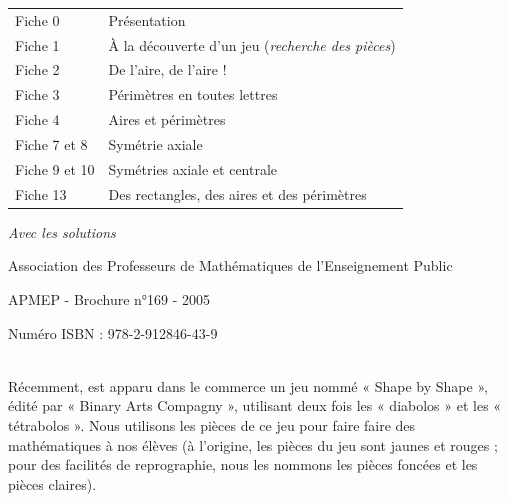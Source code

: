 \documentclass[a4paper,10pt]{article}
\begin{document}
{
	\renewcommand{\arraystretch}{1.1}
	\Large
	\hspace{-1cm}\begin{tabular}{ll}
		Fiche 0       & Présentation                                             \\
		Fiche 1       & À la découverte d'un jeu (\textit{recherche des pièces}) \\
		Fiche 2       & De l'aire, de l'aire !                                   \\
		Fiche 3       & Périmètres en toutes lettres                             \\
		Fiche 4       & Aires et périmètres                                      \\
		Fiche 7 et 8  & Symétrie axiale                                          \\
		Fiche 9 et 10 & Symétries axiale et centrale                             \\
		Fiche 13      & Des rectangles, des aires et des périmètres              \\
	\end{tabular} \vspace{2em}
}

\hfill \textit{\Large Avec les solutions} \vspace{1em}

\begin{center}
	Association des Professeurs de Mathématiques de l'Enseignement Public

	APMEP - Brochure n°169 - 2005

	Numéro ISBN : 978-2-912846-43-9
\end{center}

\newpage

\hspace{-1.2cm}\vspace{2cm}

 \\

Récemment, est apparu dans le commerce un jeu nommé « Shape by Shape », édité par « Binary Arts Compagny », utilisant deux fois les « diabolos » et les « tétrabolos ». Nous utilisons les pièces de ce jeu pour faire faire des mathématiques à nos élèves (à l'origine, les pièces du jeu sont jaunes et rouges ; pour des facilités de reprographie, nous les nommons les pièces foncées et les pièces claires).
\end{document}
